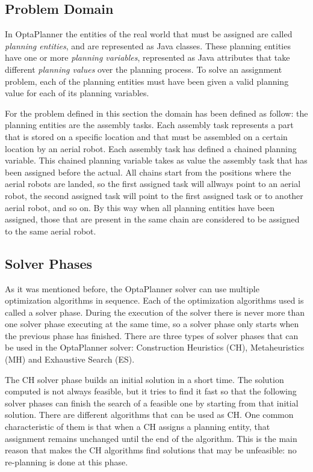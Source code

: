 \documentclass[runningheads,a4paper]{llncs}
\begin{document}
\subsection{Problem Domain}
    \label{sec:optaplanner_domain}

In OptaPlanner the entities of the real world that must be assigned are called \emph{planning entities}, and are represented as Java classes. These planning entities have one or more \emph{planning variables}, represented as Java attributes that take different \emph{planning values} over the planning process. To solve an assignment problem, each of the planning entities must have been given a valid planning value for each of its planning variables.

For the problem defined in this section the domain has been defined as follow: the planning entities are the assembly tasks. Each assembly task represents a part that is stored on a specific location and that must be assembled on a certain location by an aerial robot. Each assembly task has defined a chained planning variable. This chained planning variable takes as value the assembly task that has been assigned before the actual. All chains start from the positions where the aerial robots are landed, so the first assigned task will allways point to an aerial robot, the second assigned task will point to the first assigned task or to another aerial robot, and so on. By this way when all planning entities have been assigned, those that are present in the same chain are considered to be assigned to the same aerial robot. 

\subsection{Solver Phases}
    \label{sec:solver_phases}

As it was mentioned before, the OptaPlanner solver can use multiple optimization algorithms in sequence. Each of the optimization algorithms used is called a solver phase. During the execution of the solver there is never more than one solver phase executing at the same time, so a solver phase only starts when the previous phase has finished. There are three types of solver phases that can be used in the OptaPlanner solver: Construction Heuristics (CH), Metaheuristics (MH) and Exhaustive Search (ES). 

The CH solver phase builds an initial solution in a short time. The solution computed is not always feasible, but it tries to find it fast so that the following solver phases can finish the search of a feasible one by starting from that initial solution. There are different algorithms that can be used as CH. One common characteristic of them is that when a CH assigns a planning entity, that assignment remains unchanged until the end of the algorithm. This is the main reason that makes the CH algorithms find solutions that may be unfeasible: no re-planning is done at this phase.
\end{document}
